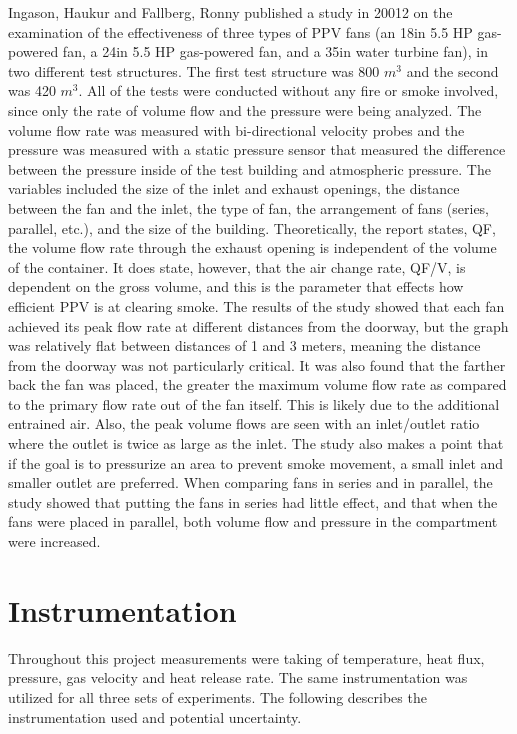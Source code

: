 \documentclass{article}
\begin{document}
Ingason, Haukur and Fallberg, Ronny published a study in 20012 on the examination of the effectiveness of three types of PPV fans (an 18in 5.5 HP gas-powered fan, a 24in 5.5 HP gas-powered fan, and a 35in water turbine fan), in two different test structures. The first test structure was 800 $m^3$ and the second was 420 $m^3$. All of the tests were conducted without any fire or smoke involved, since only the rate of volume flow and the pressure were being analyzed. The volume flow rate was measured with bi-directional velocity probes and the pressure was measured with a static pressure sensor that measured the difference between the pressure inside of the test building and atmospheric pressure. The variables included the size of the inlet and exhaust openings, the distance between the fan and the inlet, the type of fan, the arrangement of fans (series, parallel, etc.), and the size of the building. Theoretically, the report states, QF, the volume flow rate through the exhaust opening is independent of the volume of the container. It does state, however, that the air change rate, QF/V, is dependent on the gross volume, and this is the parameter that effects how efficient PPV is at clearing smoke. The results of the study showed that each fan achieved its peak flow rate at different distances from the doorway, but the graph was relatively flat between distances of 1 and 3 meters, meaning the distance from the doorway was not particularly critical. It was also found that the farther back the fan was placed, the greater the maximum volume flow rate as compared to the primary flow rate out of the fan itself. This is likely due to the additional entrained air. Also, the peak volume flows are seen with an inlet/outlet ratio where the outlet is twice as large as the inlet. The study also makes a point that if the goal is to pressurize an area to prevent smoke movement, a small inlet and smaller outlet are preferred. When comparing fans in series and in parallel, the study showed that putting the fans in series had little effect, and that when the fans were placed in parallel, both volume flow and pressure in the compartment were increased.\cite{PPVmediumhouse}

\clearpage

\section{Instrumentation}
Throughout this project measurements were taking of temperature, heat flux, pressure, gas velocity and heat release rate. The same instrumentation was utilized for all three sets of experiments. The following describes the instrumentation used and potential uncertainty.
\end{document}
